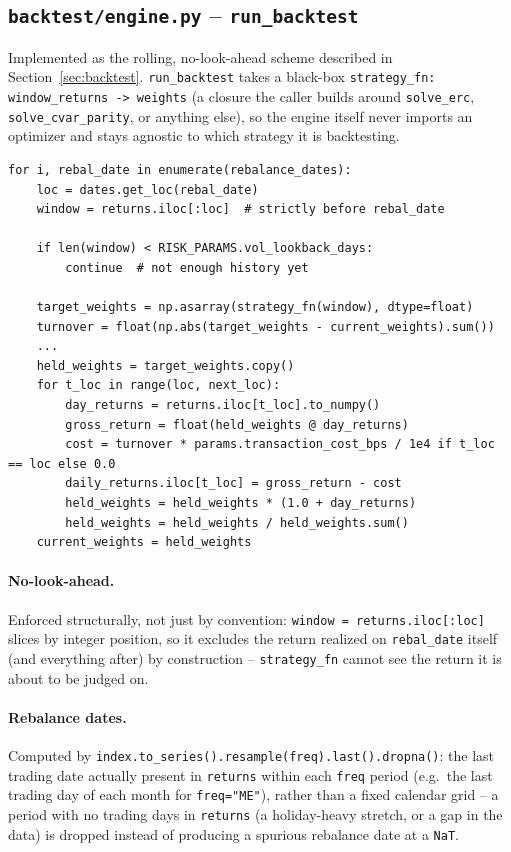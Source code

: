 \documentclass[11pt]{article}
\begin{document}
\subsection{\texttt{backtest/engine.py} -- \texttt{run\_backtest}}
\label{sec:backtest-impl}

Implemented as the rolling, no-look-ahead scheme described in
Section~\ref{sec:backtest}. \texttt{run\_backtest} takes a black-box
\texttt{strategy\_fn: window\_returns -> weights} (a closure the caller
builds around \texttt{solve\_erc}, \texttt{solve\_cvar\_parity}, or
anything else), so the engine itself never imports an optimizer and
stays agnostic to which strategy it is backtesting.

\begin{lstlisting}
for i, rebal_date in enumerate(rebalance_dates):
    loc = dates.get_loc(rebal_date)
    window = returns.iloc[:loc]  # strictly before rebal_date

    if len(window) < RISK_PARAMS.vol_lookback_days:
        continue  # not enough history yet

    target_weights = np.asarray(strategy_fn(window), dtype=float)
    turnover = float(np.abs(target_weights - current_weights).sum())
    ...
    held_weights = target_weights.copy()
    for t_loc in range(loc, next_loc):
        day_returns = returns.iloc[t_loc].to_numpy()
        gross_return = float(held_weights @ day_returns)
        cost = turnover * params.transaction_cost_bps / 1e4 if t_loc == loc else 0.0
        daily_returns.iloc[t_loc] = gross_return - cost
        held_weights = held_weights * (1.0 + day_returns)
        held_weights = held_weights / held_weights.sum()
    current_weights = held_weights
\end{lstlisting}

\paragraph{No-look-ahead.} Enforced structurally, not just by
convention: \texttt{window = returns.iloc[:loc]} slices by integer
position, so it excludes the return realized on \texttt{rebal\_date}
itself (and everything after) by construction -- \texttt{strategy\_fn}
cannot see the return it is about to be judged on.

\paragraph{Rebalance dates.} Computed by
\texttt{index.to\_series().resample(freq).last().dropna()}: the last
trading date actually present in \texttt{returns} within each
\texttt{freq} period (e.g.\ the last trading day of each month for
\texttt{freq="ME"}), rather than a fixed calendar grid -- a period with
no trading days in \texttt{returns} (a holiday-heavy stretch, or a gap
in the data) is dropped instead of producing a spurious rebalance date
at a \texttt{NaT}.
\end{document}
